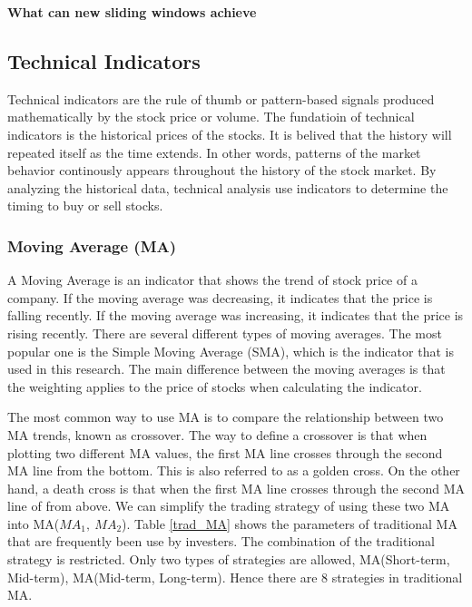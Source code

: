 \documentclass[../main.tex]{subfiles}
\begin{document}
\textbf{What can new sliding windows achieve}

\subsection{Technical Indicators}

Technical indicators are the rule of thumb or pattern-based signals produced mathematically by the stock price or volume. The fundatioin of technical indicators is the historical prices of the stocks. It is belived that the history will repeated itself as the time extends. In other words, patterns of the market behavior continously appears throughout the history of the stock market. By analyzing the historical data, technical analysis use indicators to determine the timing to buy or sell stocks.

\subsubsection{Moving Average (MA)}

A Moving Average is an indicator that shows the trend of stock price of a company. If the moving average was decreasing, it indicates that the price is falling recently. If the moving average was increasing, it indicates that the price is rising recently. There are several different types of moving averages. The most popular one is the Simple Moving Average (SMA), which is the indicator that is used in this research. The main difference between the moving averages is that the weighting applies to the price of stocks when calculating the indicator.
\bigbreak

The most common way to use MA is to compare the relationship between two MA trends, known as crossover. The way to define a crossover is that when plotting two different MA values, the first MA line crosses through the second MA line from the bottom. This is also referred to as a golden cross. On the other hand, a death cross is that when the first MA line crosses through the second MA line of from above. We can simplify the trading strategy of using these two MA into MA($MA_{1},\ MA_{2}$). Table \ref{trad_MA} shows the parameters of traditional MA that are frequently been use by investers. The combination of the traditional strategy is restricted. Only two types of strategies are allowed, MA(Short-term, Mid-term), MA(Mid-term, Long-term). Hence there are 8 strategies in traditional MA.
\bigbreak
\end{document}
